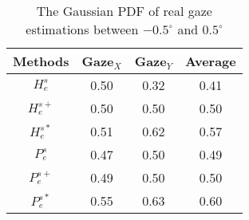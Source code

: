 \begin{table}[htbp]
	\centering
  	\caption{The Gaussian PDF of real gaze estimations between $-0.5^\circ$ and $0.5^\circ$}
  	\label{tab:real-gaussian-distribution}
  	\begin{tabular}{cccc}
    	\toprule
	    	Methods & Gaze$_X$ & Gaze$_Y$ & Average \\
    	\midrule
    		$H_e^s$ & 0.50 & 0.32 & 0.41 \\
	    	$H_e^{s+}$ & 0.50 & 0.50 & 0.50 \\
    		$H_e^{s*}$ & 0.51 & 0.62 & 0.57 \\
    		$P_e^s$ & 0.47 & 0.50 & 0.49 \\
	    	$P_e^{s+}$ & 0.49 & 0.50 & 0.50 \\
    		$P_e^{s*}$ & 0.55 & 0.63 & 0.60 \\
  		\bottomrule
	\end{tabular}
\end{table}
